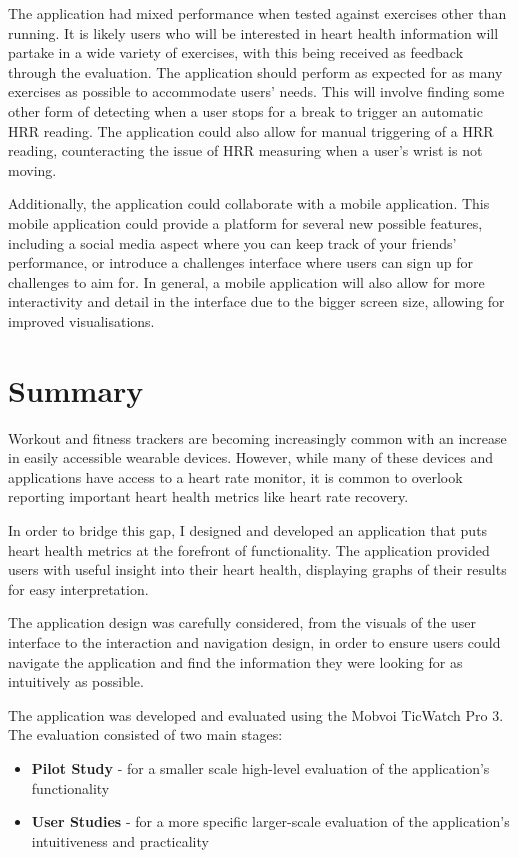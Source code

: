 \documentclass{l4proj}
\begin{document}
The application had mixed performance when tested against exercises other than running. It is likely users who will be interested in heart health information will partake in a wide variety of exercises, with this being received as feedback through the evaluation. The application should perform as expected for as many exercises as possible to accommodate users' needs. This will involve finding some other form of detecting when a user stops for a break to trigger an automatic HRR reading. The application could also allow for manual triggering of a HRR reading, counteracting the issue of HRR measuring when a user’s wrist is not moving.

Additionally, the application could collaborate with a mobile application. This mobile application could provide a platform for several new possible features, including a social media aspect where you can keep track of your friends’ performance, or introduce a challenges interface where users can sign up for challenges to aim for. In general, a mobile application will also allow for more interactivity and detail in the interface due to the bigger screen size, allowing for improved visualisations.

\section{Summary}

Workout and fitness trackers are becoming increasingly common with an increase in easily accessible wearable devices. However, while many of these devices and applications have access to a heart rate monitor, it is common to overlook reporting important heart health metrics like heart rate recovery.

In order to bridge this gap, I designed and developed an application that puts heart health metrics at the forefront of functionality. The application provided users with useful insight into their heart health, displaying graphs of their results for easy interpretation.

The application design was carefully considered, from the visuals of the user interface to the interaction and navigation design, in order to ensure users could navigate the application and find the information they were looking for as intuitively as possible.

The application was developed and evaluated using the Mobvoi TicWatch Pro 3. The evaluation consisted of two main stages:

\begin{itemize}
    \item \textbf{Pilot Study} - for a smaller scale high-level evaluation of the application’s functionality
    \item \textbf{User Studies} - for a more specific larger-scale evaluation of the application’s intuitiveness and practicality
\end{itemize}
\end{document}
